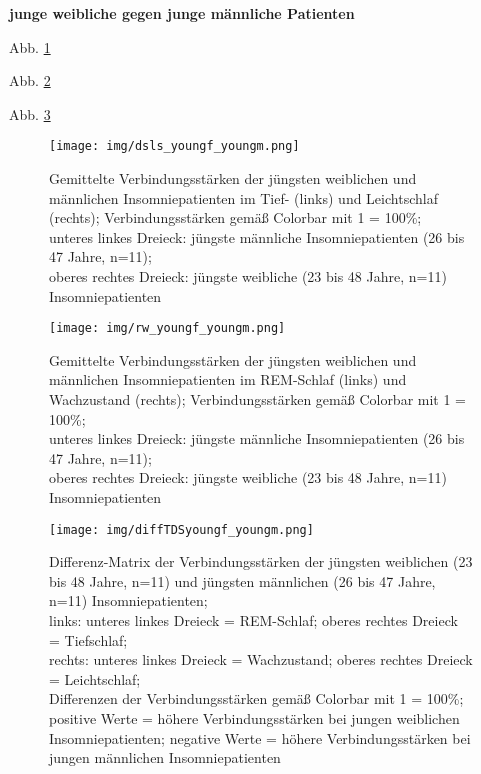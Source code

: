 \textbf{junge weibliche gegen junge männliche Patienten}

Abb. \ref{fig:dsls_youngf_youngm}

Abb. \ref{fig:rw_youngf_youngm}

Abb. \ref{fig:diffTDSyoungf_youngm}

\begin{figure}[H]
	\centering
	\texttt{[image: img/dsls\_youngf\_youngm.png]}
	\caption[Verbindungsstärken der jüngsten weiblichen und männlichen Insomniepatienten im Tief- und Leichtschlaf]{Gemittelte Verbindungsstärken der jüngsten weiblichen und männlichen Insomniepatienten im Tief- (links) und Leichtschlaf (rechts); Verbindungsstärken gemäß Colorbar mit 1 = 100\%;\\unteres linkes Dreieck: jüngste männliche Insomniepatienten (26 bis 47 Jahre, n=11);\\oberes rechtes Dreieck: jüngste weibliche (23 bis 48 Jahre, n=11) Insomniepatienten}
	\label{fig:dsls_youngf_youngm}
\end{figure}

\begin{figure}[H]
	\centering
	\texttt{[image: img/rw\_youngf\_youngm.png]}
	\caption[Verbindungsstärken der jüngsten weiblichen und männlichen Insomniepatienten im REM-Schlaf und Wachzustand]{Gemittelte Verbindungsstärken der jüngsten weiblichen und männlichen Insomniepatienten im REM-Schlaf (links) und Wachzustand (rechts); Verbindungsstärken gemäß Colorbar mit 1 = 100\%;\\unteres linkes Dreieck: jüngste männliche Insomniepatienten (26 bis 47 Jahre, n=11);\\oberes rechtes Dreieck: jüngste weibliche (23 bis 48 Jahre, n=11) Insomniepatienten}
	\label{fig:rw_youngf_youngm}
\end{figure}

\begin{figure}[H]
	\centering
	\texttt{[image: img/diffTDSyoungf\_youngm.png]}
	\caption[Differenz-Matrix der Verbindungsstärken der jüngsten weiblichen und männlichen Insomniepatienten]{Differenz-Matrix der Verbindungsstärken der jüngsten weiblichen (23 bis 48 Jahre, n=11) und jüngsten männlichen (26 bis 47 Jahre, n=11) Insomniepatienten;\\links: unteres linkes Dreieck = REM-Schlaf; oberes rechtes Dreieck = Tiefschlaf;\\rechts: unteres linkes Dreieck = Wachzustand; oberes rechtes Dreieck = Leichtschlaf;\\Differenzen der Verbindungsstärken gemäß Colorbar mit 1 = 100\%;\\positive Werte = höhere Verbindungsstärken bei jungen weiblichen Insomniepatienten; negative Werte = höhere Verbindungsstärken bei jungen männlichen Insomniepatienten}
	\label{fig:diffTDSyoungf_youngm}
\end{figure}



